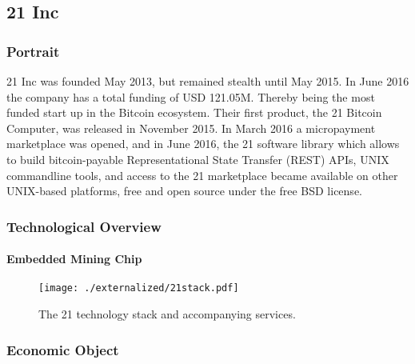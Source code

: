 \subsection{21 Inc}

\subsubsection{Portrait}
21 Inc was founded May 2013, but remained stealth until May 2015. In June 2016 the company has a total funding of USD 121.05M. Thereby being the most funded start up in the Bitcoin ecosystem. Their first product, the 21 Bitcoin Computer, was released in November 2015. In March 2016 a micropayment marketplace was opened, and in June 2016, the 21 software library which allows to build bitcoin-payable Representational State Transfer (REST) APIs, UNIX commandline tools, and access to the 21 marketplace became available on other UNIX-based platforms, free and open source under the free BSD license.

\subsubsection{Technological Overview}

\paragraph{Embedded Mining Chip}

\begin{figure}
\texttt{[image: ./externalized/21stack.pdf]}
\caption{The 21 technology stack and accompanying services.}
\label{fig:21stack}
\end{figure}


\subsubsection{Economic Object}


